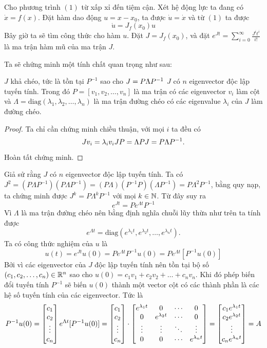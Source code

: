 \documentclass[12pt]{scrartcl}
\begin{document}
Cho phương trình $(1)$ từ xấp xỉ đến tiệm cận. Xét hệ động lực ta đang có $\dot{x} = f(x)$. Đặt hàm dao động $u = x - x_0$, ta được $\dot{u} = \dot{x}$ và từ $(1)$ ta được 
\[
    \dot{u} = J_f(x_0)u
\]
Bây giờ ta sẽ tìm công thức cho hàm $u$. Đặt $J = J_f(x_0)$, và đặt $e^{Jt} = \displaystyle\sum_{i = 0}^{\infty} \frac{J^i t^i}{i!}$ là ma trận hàm mũ của ma trận $J$. 

Ta sẽ chứng minh một tính chất quan trọng như sau:
\begin{theorem}
    $J$ khả chéo, tức là tồn tại $P^{-1}$ sao cho $J = P\Lambda P^{-1}\lra$ $J$ có $n$ eigenvector độc lập tuyến tính. Trong đó $P= [v_1, v_2, \ldots, v_n]$ là ma trận có các eigenvector $v_i$ làm cột và $\Lambda = \text{diag}(\lambda_1, \lambda_2, \ldots, \lambda_n)$ là ma trận đường chéo có các eigenvalue $\lambda_i$ của $J$ làm đường chéo.
\end{theorem}
\begin{proof}
    Ta chỉ cần chứng minh chiều thuận, với mọi $i$ ta đều có 
    \[
        J v_i = \lambda_i v_i \ra JP = \Lambda P \lra J  = P\Lambda P^{-1}.
    \]
    Hoàn tất chứng minh.
\end{proof}
Giả sử rằng $J$ có $n$ eigenvector độc lập tuyến tính. Ta có $J^2 = (P\Lambda P^{-1})(P\Lambda P^{-1}) = (P\Lambda)( P^{-1}P)(\Lambda P^{-1}) = P\Lambda^2 P^{-1}$, bằng quy nạp, ta chứng minh được $J^k = P\Lambda^k P^{-1}$ với mọi $k \in \mathbb{N}$. Từ đây suy ra 
\[
    e^{Jt} = P e^{\Lambda t} P^{-1} 
\]
Vì $\Lambda$ là ma trận đường chéo nên bằng định nghĩa chuỗi lũy thừa như trên ta tính được 
\[
    e^{\Lambda t} = \text{diag}(e^{\lambda_1 t}, e^{\lambda_2 t}, \ldots, e^{\lambda_n t}).
\]
Ta có công thức nghiệm của $u$ là 
\[
    u(t) = e^{Jt} u(0) = P e^{\Lambda t} P^{-1} u(0) = P e^{\Lambda t} [P^{-1} u(0)]
\]
Bởi vì các eigenvector của $J$ độc lập tuyến tính nên tồn tại bộ số $(c_1,c_2,\dots,c_n) \in \mathbb{R}^n$ sao cho $u(0) = c_1 v_1 + c_2 v_2 + \ldots + c_n v_n$. Khi đó phép biến đổi tuyến tính $P^{-1}$ sẽ biến $u(0)$ thành một vector cột có các thành phần là các hệ số tuyến tính của các eigenvector. Tức là \[P^{-1} u(0) = \begin{bmatrix}
    c_1 \\ c_2 \\ \vdots \\ c_n
\end{bmatrix} \ra e^{\Lambda t} [P^{-1} u(0)] = \begin{bmatrix}
    c_1 \\ c_2 \\ \vdots \\ c_n
\end{bmatrix}\cdot\begin{bmatrix}
e^{\lambda_1 t} & 0 & \cdots & 0 \\
0 & e^{\lambda_2 t} & \cdots & 0 \\
\vdots & \vdots & \ddots & \vdots \\
0 & 0 & \cdots & e^{\lambda_n t}
\end{bmatrix} = \begin{bmatrix}
    c_1 e^{\lambda_1 t} \\ c_2 e^{\lambda_2 t} \\ \vdots \\ c_n e^{\lambda_n t}
\end{bmatrix} = A \]
\end{document}

